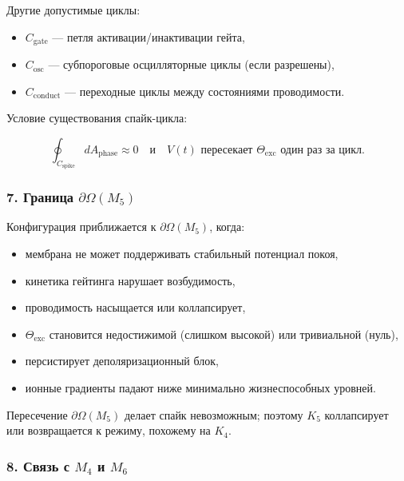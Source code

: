 Другие допустимые циклы:

\begin{itemize}
    \item $C_{\mathrm{gate}}$ — петля активации/инактивации гейта,
    \item $C_{\mathrm{osc}}$ — субпороговые осцилляторные циклы (если разрешены),
    \item $C_{\mathrm{conduct}}$ — переходные циклы между состояниями проводимости.
\end{itemize}

Условие существования спайк-цикла:

\[
\oint_{C_{\mathrm{spike}}} dA_{\mathrm{phase}} \approx 0
\quad\text{и}\quad
V(t) \text{ пересекает } \Theta_{\mathrm{exc}} \text{ один раз за цикл}.
\]

\subsubsection*{7. Граница \texorpdfstring{$\partial\Omega(M_5)$}{\partial\Omega(M_5)}}

Конфигурация приближается к $\partial\Omega(M_5)$, когда:

\begin{itemize}
    \item мембрана не может поддерживать стабильный потенциал покоя,
    \item кинетика гейтинга нарушает возбудимость,
    \item проводимость насыщается или коллапсирует,
    \item $\Theta_{\mathrm{exc}}$ становится недостижимой (слишком высокой) или тривиальной (нуль),
    \item персистирует деполяризационный блок,
    \item ионные градиенты падают ниже минимально жизнеспособных уровней.
\end{itemize}

Пересечение $\partial\Omega(M_5)$ делает спайк невозможным;
поэтому $K_5$ коллапсирует или возвращается к режиму, похожему на $K_4$.

\subsubsection*{8. Связь с \texorpdfstring{$M_4$}{M_4} и \texorpdfstring{$M_6$}{M_6}}

